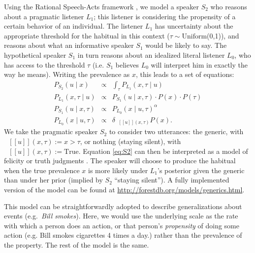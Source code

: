 \documentclass[11pt,letterpaper]{article}
\newcommand{\denote}[1]{\mbox{ $[\![ #1 ]\!]$}}
\begin{document}
Using the Rational Speech-Acts framework \cite{Frank2012,Goodman2013}, 
we model a speaker $S_2$ who reasons about a pragmatic listener $L_1$; this listener is considering the propensity of a certain behavior of an individual.
The listener $L_1$ has uncertainty about the appropriate threshold for the habitual in this context ($\tau \sim \text{Uniform}$(0,1)), and reasons about what an informative speaker $S_1$ would be likely to say. The hypothetical speaker $S_1$ in turn reasons about an idealized literal listener $L_0$, who has access to the threshold $\tau$ (i.e. $S_1$ believes $L_0$ will interpret him in exactly the way he means). 
Writing the prevalence as $x$, this leads to a set of equations:
%
\begin{eqnarray}
P_{S_{2}}(u \mid x) & \propto &  \int_{\tau} P_{L_{1}}(x , \tau \mid u) \label{eq:S2}\\
P_{L_{1}}(x , \tau \mid u) &\propto& P_{S_{1}}(u \mid x, \tau) \cdot P(x) \cdot P(\tau) \label{eq:L1}\\
P_{S_{1}}(u \mid x, \tau) &\propto&  {P_{L_{0}}(x \mid u, \tau)}^{\alpha} \label{eq:S1}\\
P_{L_{0}}(x \mid u, \tau) &\propto& {\delta_{\denote{u}(x, \tau)} P(x)}. \label{eq:L0}
\end{eqnarray}
%
We take the pragmatic speaker $S_2$ to consider two utterances: the generic, with $\denote{u}(x, \tau) := x>\tau$, or nothing (staying silent), with $\denote{u}(x, \tau) := \text{True}$.
Equation \ref{eq:S2} can then be interpreted as a model of felicity or truth judgments \cite{Degen2014, TesslerUnderReview}.
The speaker will choose to produce the habitual when the true prevalence $x$ is more likely under $L_1$'s posterior given the generic than under her prior (implied by $S_2$ ``staying silent''). 
A fully implemented version of the model can be found at \url{http://forestdb.org/models/generics.html}.

This model can be straightforwardly adopted to describe generalizations about events (e.g.~\emph{Bill smokes}). 
Here, we would use the underlying scale as the rate with which a person does an action, or that person's \emph{propensity} of doing some action (e.g. Bill smokes cigarettes 4 times a day.) rather than the prevalence of the property. 
The rest of the model is the same.



 
\end{document}
